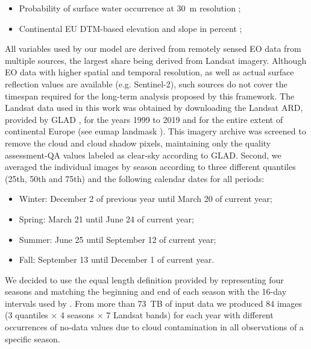     \begin{itemize}
    \item Probability of surface water occurrence at 30~m resolution \citep{pekel2016high};
    \item Continental EU DTM-based elevation and slope in percent \citep{hengl2020dtm};
    \end{itemize}

    All variables used by our model are derived from remotely sensed EO data from multiple sources, the largest share being derived from Landsat imagery. Although EO data with higher spatial and temporal resolution, as well as actual surface reflection values are available (e.g. Sentinel-2), such sources do not cover the timespan required for the long-term analysis proposed by this framework. The Landsat data used in this work was obtained by downloading the Landsat ARD, provided by GLAD \citep{potapov2020landsat}, for the years 1999 to 2019 and for the entire extent of continental Europe (see \textsf{eumap} landmask \citep{hengl2020dtm}). This imagery archive was screened to remove the cloud and cloud shadow pixels, maintaining only the quality assessment-QA values labeled as clear-sky according to GLAD. Second, we averaged the individual images by season according to three different quantiles (25th, 50th and 75th) and the following calendar dates for all periods:
    
    \begin{itemize}
    \item Winter: December 2 of previous year until March 20 of current year;
    \item Spring: March 21 until June 24 of current year;
    \item Summer: June 25 until September 12 of current year;
    \item Fall: September 13 until December 1 of current year.
    \end{itemize}
    
    We decided to use the equal length definition provided by \citet{trenberth1983seasons} representing four seasons and matching the beginning and end of each season with the 16-day intervals used by \citet{potapov2020landsat}. From more than 73~TB of input data we produced 84 images (3 quantiles $\times$ 4 seasons $\times$ 7 Landsat bands) for each year with different occurrences of no-data values due to cloud contamination in all observations of a specific season. 
    
